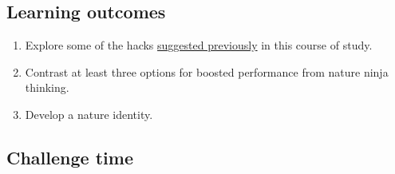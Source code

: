 \documentclass[
]{book}
\providecommand{\tightlist}{%
  \setlength{\itemsep}{0pt}\setlength{\parskip}{0pt}}
\begin{document}
\hypertarget{learning-outcomes-2}{%
\subsection*{Learning outcomes}\label{learning-outcomes-2}}

\begin{enumerate}
\def\labelenumi{\arabic{enumi}.}
\tightlist
\item
  Explore some of the hacks \href{https://figshare.com/articles/presentation/Nature_hacks_for_life/16878808}{suggested previously} in this course of study.\\
\item
  Contrast at least three options for boosted performance from nature ninja thinking.\\
\item
  Develop a nature identity.
\end{enumerate}

\hypertarget{challenge-time-2}{%
\subsection*{Challenge time}\label{challenge-time-2}}
\end{document}
